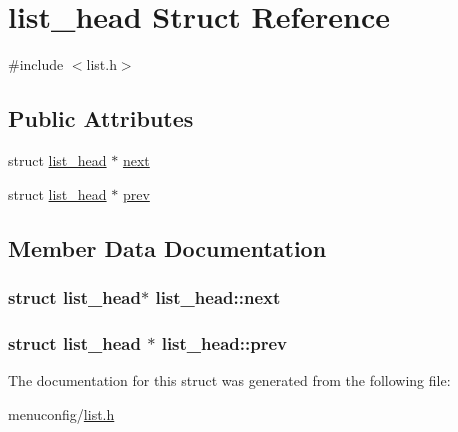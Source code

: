 \hypertarget{structlist__head}{\section{list\-\_\-head Struct Reference}
\label{structlist__head}
}


{\ttfamily \#include $<$list.\-h$>$}

\subsection*{Public Attributes}
\begin{DoxyCompactItemize}
\item 
struct \hyperlink{structlist__head}{list\-\_\-head} $\ast$ \hyperlink{structlist__head_ac3b0ff0dfb978a0cfbdad6b9d19cdcfe}{next}
\item 
struct \hyperlink{structlist__head}{list\-\_\-head} $\ast$ \hyperlink{structlist__head_aaa0eabda8877e1d6de73a33f223ad004}{prev}
\end{DoxyCompactItemize}


\subsection{Member Data Documentation}
\hypertarget{structlist__head_ac3b0ff0dfb978a0cfbdad6b9d19cdcfe}{
\subsubsection[{next}]{\setlength{\rightskip}{0pt plus 5cm}struct {\bf list\-\_\-head}$\ast$ list\-\_\-head\-::next}}\label{structlist__head_ac3b0ff0dfb978a0cfbdad6b9d19cdcfe}
\hypertarget{structlist__head_aaa0eabda8877e1d6de73a33f223ad004}{
\subsubsection[{prev}]{\setlength{\rightskip}{0pt plus 5cm}struct {\bf list\-\_\-head} $\ast$ list\-\_\-head\-::prev}}\label{structlist__head_aaa0eabda8877e1d6de73a33f223ad004}


The documentation for this struct was generated from the following file\-:\begin{DoxyCompactItemize}
\item 
menuconfig/\hyperlink{list_8h}{list.\-h}\end{DoxyCompactItemize}
